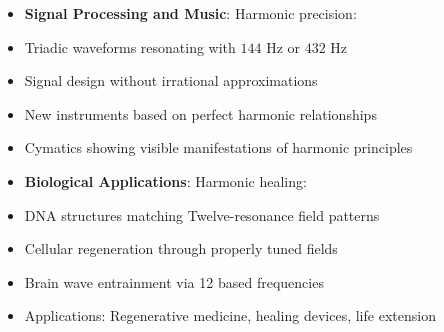     
    \begin{itemize}
        \item \texttt{} \textbf{Signal Processing and Music}: Harmonic precision:
        \item Triadic waveforms resonating with \(144 \text{ Hz}\) or \(432 \text{ Hz}\)
        \item Signal design without irrational approximations
        \item New instruments based on perfect harmonic relationships
        \item Cymatics showing visible manifestations of harmonic principles
    \end{itemize}
    
   
    \begin{itemize}
        \item \texttt{} \textbf{Biological Applications}: Harmonic healing:
        \item DNA structures matching Twelve-resonance field patterns
        \item Cellular regeneration through properly tuned fields
        \item Brain wave entrainment via 12 based frequencies
        \item Applications: Regenerative medicine, healing devices, life extension
    \end{itemize}


